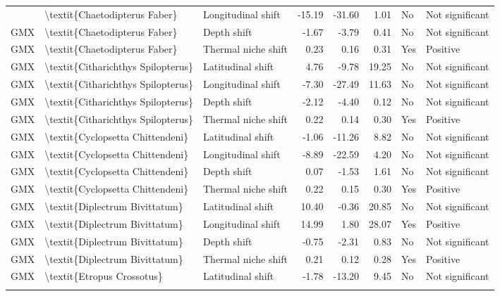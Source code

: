 \begin{longtable}[t]{lllrrrll}
{{GMX & \textbackslash{}textit\{Chaetodipterus Faber\} & Longitudinal shift & -15.19 & -31.60 & 1.01 & No & Not significant\\
GMX & \textbackslash{}textit\{Chaetodipterus Faber\} & Depth shift & -1.67 & -3.79 & 0.41 & No & Not significant\\
GMX & \textbackslash{}textit\{Chaetodipterus Faber\} & Thermal niche shift & 0.23 & 0.16 & 0.31 & Yes & Positive\\
GMX & \textbackslash{}textit\{Citharichthys Spilopterus\} & Latitudinal shift & 4.76 & -9.78 & 19.25 & No & Not significant\\
\addlinespace
GMX & \textbackslash{}textit\{Citharichthys Spilopterus\} & Longitudinal shift & -7.30 & -27.49 & 11.63 & No & Not significant\\
GMX & \textbackslash{}textit\{Citharichthys Spilopterus\} & Depth shift & -2.12 & -4.40 & 0.12 & No & Not significant\\
GMX & \textbackslash{}textit\{Citharichthys Spilopterus\} & Thermal niche shift & 0.22 & 0.14 & 0.30 & Yes & Positive\\
GMX & \textbackslash{}textit\{Cyclopsetta Chittendeni\} & Latitudinal shift & -1.06 & -11.26 & 8.82 & No & Not significant\\
GMX & \textbackslash{}textit\{Cyclopsetta Chittendeni\} & Longitudinal shift & -8.89 & -22.59 & 4.20 & No & Not significant\\
\addlinespace
GMX & \textbackslash{}textit\{Cyclopsetta Chittendeni\} & Depth shift & 0.07 & -1.53 & 1.61 & No & Not significant\\
GMX & \textbackslash{}textit\{Cyclopsetta Chittendeni\} & Thermal niche shift & 0.22 & 0.15 & 0.30 & Yes & Positive\\
GMX & \textbackslash{}textit\{Diplectrum Bivittatum\} & Latitudinal shift & 10.40 & -0.36 & 20.85 & No & Not significant\\
GMX & \textbackslash{}textit\{Diplectrum Bivittatum\} & Longitudinal shift & 14.99 & 1.80 & 28.07 & Yes & Positive\\
GMX & \textbackslash{}textit\{Diplectrum Bivittatum\} & Depth shift & -0.75 & -2.31 & 0.83 & No & Not significant\\
\addlinespace
GMX & \textbackslash{}textit\{Diplectrum Bivittatum\} & Thermal niche shift & 0.21 & 0.12 & 0.28 & Yes & Positive\\
GMX & \textbackslash{}textit\{Etropus Crossotus\} & Latitudinal shift & -1.78 & -13.20 & 9.45 & No & Not significant\\
}}
\end{longtable}
